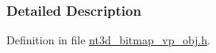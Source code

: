 \subsubsection{Detailed Description}


Definition in file \hyperlink{nt3d__bitmap__vp__obj_8h_source}{nt3d\_\-bitmap\_\-vp\_\-obj.h}.

